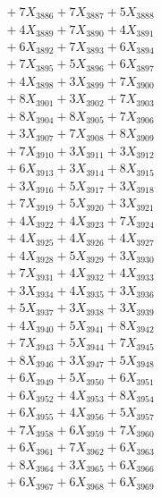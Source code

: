\documentclass[a4paper,10pt]{article}
\begin{document}
{\begin{align}
&\;  + 7 X_{3886} + 7 X_{3887} + 5 X_{3888} \\[0.3ex]
&\;  + 4 X_{3889} + 7 X_{3890} + 4 X_{3891} \\[0.3ex]
&\;  + 6 X_{3892} + 7 X_{3893} + 6 X_{3894} \\[0.3ex]
&\;  + 7 X_{3895} + 5 X_{3896} + 6 X_{3897} \\[0.3ex]
&\;  + 4 X_{3898} + 3 X_{3899} + 7 X_{3900} \\[0.3ex]
&\;  + 8 X_{3901} + 3 X_{3902} + 7 X_{3903} \\[0.3ex]
&\;  + 8 X_{3904} + 8 X_{3905} + 7 X_{3906} \\[0.3ex]
&\;  + 3 X_{3907} + 7 X_{3908} + 8 X_{3909} \\[0.5ex]\allowbreak
&\;  + 7 X_{3910} + 3 X_{3911} + 3 X_{3912} \\[0.3ex]
&\;  + 6 X_{3913} + 3 X_{3914} + 8 X_{3915} \\[0.3ex]
&\;  + 3 X_{3916} + 5 X_{3917} + 3 X_{3918} \\[0.3ex]
&\;  + 7 X_{3919} + 5 X_{3920} + 3 X_{3921} \\[0.3ex]
&\;  + 4 X_{3922} + 4 X_{3923} + 7 X_{3924} \\[0.3ex]
&\;  + 4 X_{3925} + 4 X_{3926} + 4 X_{3927} \\[0.3ex]
&\;  + 4 X_{3928} + 5 X_{3929} + 3 X_{3930} \\[0.3ex]
&\;  + 7 X_{3931} + 4 X_{3932} + 4 X_{3933} \\[0.3ex]
&\;  + 3 X_{3934} + 4 X_{3935} + 3 X_{3936} \\[0.3ex]
&\;  + 5 X_{3937} + 3 X_{3938} + 3 X_{3939} \\[0.5ex]\allowbreak
&\;  + 4 X_{3940} + 5 X_{3941} + 8 X_{3942} \\[0.3ex]
&\;  + 7 X_{3943} + 5 X_{3944} + 7 X_{3945} \\[0.3ex]
&\;  + 8 X_{3946} + 3 X_{3947} + 5 X_{3948} \\[0.3ex]
&\;  + 6 X_{3949} + 5 X_{3950} + 6 X_{3951} \\[0.3ex]
&\;  + 6 X_{3952} + 4 X_{3953} + 8 X_{3954} \\[0.3ex]
&\;  + 6 X_{3955} + 4 X_{3956} + 5 X_{3957} \\[0.3ex]
&\;  + 7 X_{3958} + 6 X_{3959} + 7 X_{3960} \\[0.3ex]
&\;  + 6 X_{3961} + 7 X_{3962} + 6 X_{3963} \\[0.3ex]
&\;  + 8 X_{3964} + 3 X_{3965} + 6 X_{3966} \\[0.3ex]
&\;  + 6 X_{3967} + 6 X_{3968} + 6 X_{3969} \\[0.5ex]\allowbreak

\end{align}}
\end{document}
